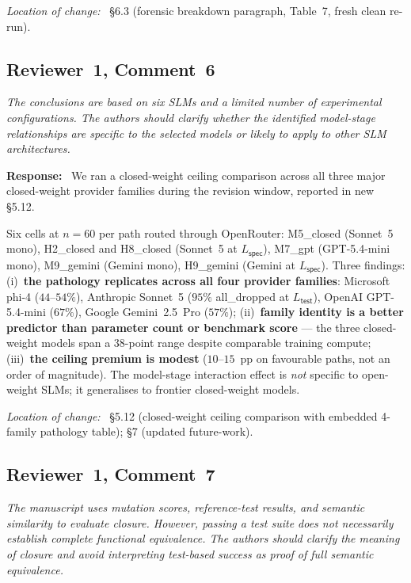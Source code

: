\documentclass[11pt,a4paper]{article}
\newenvironment{reviewerquote}
  {\begin{tcolorbox}[colback=black!5, colframe=black!15, boxrule=0.3pt,
                     arc=1pt, left=6pt, right=6pt, top=3pt, bottom=3pt,
                     breakable]\itshape\small}
  {\end{tcolorbox}}
\newcommand{\rcomment}[2]{\subsection*{Reviewer~#1, Comment~#2}}
\newcommand{\response}{\noindent\textbf{Response:}\ }
\newcommand{\loc}{\par\smallskip\noindent\textit{Location of change:}\ }
\begin{document}
\loc{} \S6.3 (forensic breakdown paragraph, Table~7, fresh clean re-run).

\rcomment{1}{6}

\begin{reviewerquote}
The conclusions are based on six SLMs and a limited number of experimental configurations. The authors should clarify whether the identified model-stage relationships are specific to the selected models or likely to apply to other SLM architectures.
\end{reviewerquote}

\response{}
We ran a closed-weight ceiling comparison across all three major closed-weight provider families during the revision window, reported in new \S5.12.

Six cells at $n = 60$ per path routed through OpenRouter: M5\_closed (Sonnet~5 mono), H2\_closed and H8\_closed (Sonnet~5 at $L_{\textsf{spec}}$), M7\_gpt (GPT-5.4-mini mono), M9\_gemini (Gemini mono), H9\_gemini (Gemini at $L_{\textsf{spec}}$). Three findings: (i)~\textbf{the pathology replicates across all four provider families}: Microsoft phi-4 ($44$--$54\%$), Anthropic Sonnet~5 ($95\%$ \textsf{all\_dropped} at $L_{\textsf{test}}$), OpenAI GPT-5.4-mini ($67\%$), Google Gemini~2.5~Pro ($57\%$); (ii)~\textbf{family identity is a better predictor than parameter count or benchmark score} --- the three closed-weight models span a $38$-point range despite comparable training compute; (iii)~\textbf{the ceiling premium is modest} ($10$--$15$~pp on favourable paths, not an order of magnitude). The model-stage interaction effect is \emph{not} specific to open-weight SLMs; it generalises to frontier closed-weight models.

\loc{} \S5.12 (closed-weight ceiling comparison with embedded 4-family pathology table); \S7 (updated future-work).

\rcomment{1}{7}

\begin{reviewerquote}
The manuscript uses mutation scores, reference-test results, and semantic similarity to evaluate closure. However, passing a test suite does not necessarily establish complete functional equivalence. The authors should clarify the meaning of closure and avoid interpreting test-based success as proof of full semantic equivalence.
\end{reviewerquote}
\end{document}
